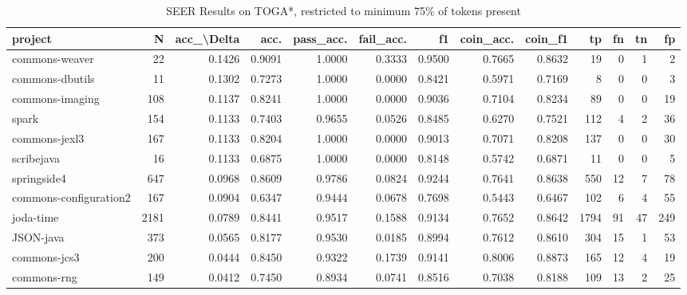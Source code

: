 \begin{table}
\centering
\caption{SEER Results on TOGA*, restricted to minimum 75\% of tokens present}
\label{tab:toga_results_25}
\begin{tabular}{lrrrrrrrrrrrr}
\toprule
                project &      N &  acc\_\textbackslash Delta &    acc. &  pass\_acc. &  fail\_acc. &      f1 &  coin\_acc. &  coin\_f1 &     tp &   fn &   tn &    fp \\
\midrule
         commons-weaver &     22 &      0.1426 &  0.9091 &     1.0000 &     0.3333 &  0.9500 &     0.7665 &   0.8632 &     19 &    0 &    1 &     2 \\
        commons-dbutils &     11 &      0.1302 &  0.7273 &     1.0000 &     0.0000 &  0.8421 &     0.5971 &   0.7169 &      8 &    0 &    0 &     3 \\
        commons-imaging &    108 &      0.1137 &  0.8241 &     1.0000 &     0.0000 &  0.9036 &     0.7104 &   0.8234 &     89 &    0 &    0 &    19 \\
                  spark &    154 &      0.1133 &  0.7403 &     0.9655 &     0.0526 &  0.8485 &     0.6270 &   0.7521 &    112 &    4 &    2 &    36 \\
          commons-jexl3 &    167 &      0.1133 &  0.8204 &     1.0000 &     0.0000 &  0.9013 &     0.7071 &   0.8208 &    137 &    0 &    0 &    30 \\
             scribejava &     16 &      0.1133 &  0.6875 &     1.0000 &     0.0000 &  0.8148 &     0.5742 &   0.6871 &     11 &    0 &    0 &     5 \\
            springside4 &    647 &      0.0968 &  0.8609 &     0.9786 &     0.0824 &  0.9244 &     0.7641 &   0.8638 &    550 &   12 &    7 &    78 \\
 commons-configuration2 &    167 &      0.0904 &  0.6347 &     0.9444 &     0.0678 &  0.7698 &     0.5443 &   0.6467 &    102 &    6 &    4 &    55 \\
              joda-time &   2181 &      0.0789 &  0.8441 &     0.9517 &     0.1588 &  0.9134 &     0.7652 &   0.8642 &   1794 &   91 &   47 &   249 \\
              JSON-java &    373 &      0.0565 &  0.8177 &     0.9530 &     0.0185 &  0.8994 &     0.7612 &   0.8610 &    304 &   15 &    1 &    53 \\
           commons-jcs3 &    200 &      0.0444 &  0.8450 &     0.9322 &     0.1739 &  0.9141 &     0.8006 &   0.8873 &    165 &   12 &    4 &    19 \\
            commons-rng &    149 &      0.0412 &  0.7450 &     0.8934 &     0.0741 &  0.8516 &     0.7038 &   0.8188 &    109 &   13 &    2 &    25 \\

\end{tabular}
\end{table}
